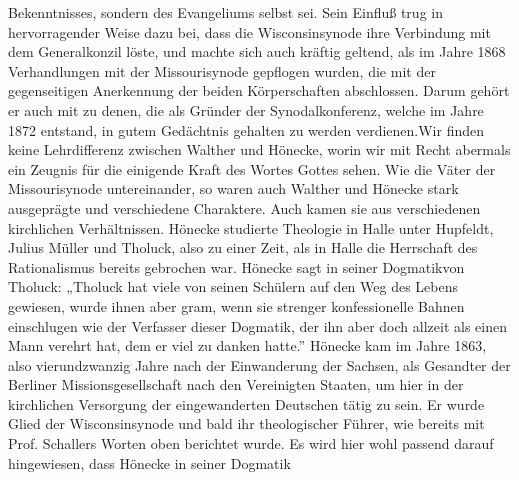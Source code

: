 Bekenntnisses, sondern des Evangeliums selbst sei. Sein Einfluß trug in hervorragender Weise dazu bei, dass die Wisconsinsynode ihre Verbindung mit dem Generalkonzil löste, und machte sich auch kräftig geltend, als im Jahre 1868 Verhandlungen mit der Missourisynode gepflogen wurden, die mit der gegenseitigen Anerkennung der beiden Körperschaften abschlossen. Darum gehört er auch mit zu denen, die als Gründer der Synodalkonferenz, welche im Jahre 1872 entstand, in gutem Gedächtnis gehalten zu werden verdienen.\footnotemark[628] Wir finden keine Lehrdifferenz zwischen Walther und Hönecke, worin wir mit Recht abermals ein Zeugnis für die einigende Kraft des Wortes Gottes sehen. Wie die Väter der Missourisynode untereinander, so waren auch Walther und Hönecke stark ausgeprägte und verschiedene Charaktere. Auch kamen sie aus verschiedenen kirchlichen Verhältnissen. Hönecke studierte Theologie in Halle unter Hupfeldt, Julius Müller und Tholuck, also zu einer Zeit, als in Halle die Herrschaft des Rationalismus bereits gebrochen war. Hönecke sagt in seiner Dogmatik\footnotemark[629] von Tholuck: „Tholuck hat viele von seinen Schülern auf den Weg des Lebens gewiesen, wurde ihnen aber gram, wenn sie strenger konfessionelle Bahnen einschlugen wie der Verfasser dieser Dogmatik, der ihn aber doch allzeit als einen Mann verehrt hat, dem er viel zu danken hatte.” Hönecke kam im Jahre 1863, also vierundzwanzig Jahre nach der Einwanderung der Sachsen, als Gesandter der Berliner Missionsgesellschaft nach den Vereinigten Staaten, um hier in der kirchlichen Versorgung der eingewanderten Deutschen tätig zu sein. Er wurde Glied der Wisconsinsynode und bald ihr theologischer Führer, wie bereits mit Prof. Schallers Worten oben berichtet wurde. Es wird hier wohl passend darauf hingewiesen, dass Hönecke in seiner Dogmatik\footnotemark[630} auch Walther als Theologen beschreibt. In dieser Schilderung Walthers beigeschreibt Hönecke zugleich sich selbst als Theologen, wie aus den beigefügten Urteilen hervorgeht. Er sagt über Walther: „Karl F. W. Walther war Schrifftheologe. Was der Nitzschianer Rattenbusch (Von Schleiermacher zu Nitzsch, S. 3) als Schwäche Walthers hinstellt, dass er für die Dogmatik wieder die Parole: Nur loci ausgegeben habe, da es die Signatur der Offenbarung sei, dass wir nur unzusammenhängende Stücke aus Gottes Geheimnissen erfahren, das muss Walther als Lob angerechnet\footnotetext[628]{}